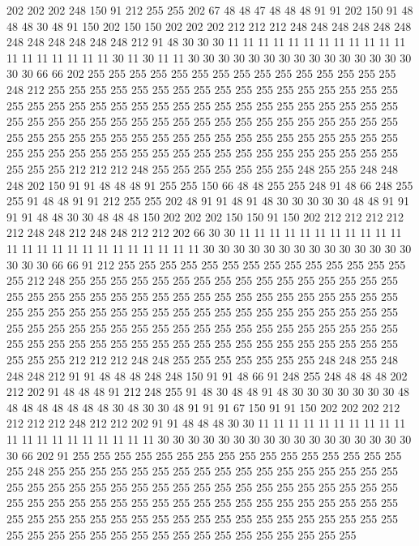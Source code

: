 202 202 202 248 150 91 212 255 255 202 67 48 48 47 48 48 48 91 91 202
150 91 48 48 48 30 48 91 150 202 150 150 202 202 202 212 212 212 248 248
248 248 248 248 248 248 248 248 248 248 212 91 48 30 30 30 11 11 11 11
11 11 11 11 11 11 11 11 11 11 11 11 11 11 11 30 11 30 11 11
30 30 30 30 30 30 30 30 30 30 30 30 30 30 30 30 30 66 66 202
255 255 255 255 255 255 255 255 255 255 255 255 255 255 255 248 212 255 255 255
255 255 255 255 255 255 255 255 255 255 255 255 255 255 255 255 255 255 255 255
255 255 255 255 255 255 255 255 255 255 255 255 255 255 255 255 255 255 255 255
255 255 255 255 255 255 255 255 255 255 255 255 255 255 255 255 255 255 255 255
255 255 255 255 255 255 255 255 255 255 255 255 255 255 255 255 255 255 255 255
255 255 255 255 255 255 255 255 255 255 255 255 255 212 212 212 248 255 255 255
255 255 255 255 248 255 255 248 248 248 202 150 91 91 48 48 48 91 255 255
150 66 48 48 255 255 248 91 48 66 248 255 255 91 48 48 91 91 212 255
255 202 48 91 91 48 91 48 30 30 30 30 30 48 48 91 91 91 91 48
48 30 30 48 48 48 150 202 202 202 150 150 91 150 202 212 212 212 212 212
248 248 212 248 248 212 212 202 66 30 30 11 11 11 11 11 11 11 11 11
11 11 11 11 11 11 11 11 11 11 11 11 11 11 11 30 30 30 30 30
30 30 30 30 30 30 30 30 30 30 30 30 66 66 91 212 255 255 255 255
255 255 255 255 255 255 255 255 255 255 255 212 248 255 255 255 255 255 255 255
255 255 255 255 255 255 255 255 255 255 255 255 255 255 255 255 255 255 255 255
255 255 255 255 255 255 255 255 255 255 255 255 255 255 255 255 255 255 255 255
255 255 255 255 255 255 255 255 255 255 255 255 255 255 255 255 255 255 255 255
255 255 255 255 255 255 255 255 255 255 255 255 255 255 255 255 255 255 255 255
255 255 255 255 255 255 255 255 212 212 212 248 248 255 255 255 255 255 255 255
248 248 255 248 248 248 212 91 91 48 48 48 248 248 150 91 91 48 66 91
248 255 248 48 48 48 202 212 202 91 48 48 48 91 212 248 255 91 48 30
48 48 91 48 30 30 30 30 30 30 30 48 48 48 48 48 48 48 48 30
48 30 30 48 91 91 91 67 150 91 91 150 202 202 202 212 212 212 212 248
212 212 202 91 91 48 48 48 30 30 11 11 11 11 11 11 11 11 11 11
11 11 11 11 11 11 11 11 11 11 30 30 30 30 30 30 30 30 30 30
30 30 30 30 30 30 30 30 66 202 91 255 255 255 255 255 255 255 255 255
255 255 255 255 255 255 255 255 248 255 255 255 255 255 255 255 255 255 255 255
255 255 255 255 255 255 255 255 255 255 255 255 255 255 255 255 255 255 255 255
255 255 255 255 255 255 255 255 255 255 255 255 255 255 255 255 255 255 255 255
255 255 255 255 255 255 255 255 255 255 255 255 255 255 255 255 255 255 255 255
255 255 255 255 255 255 255 255 255 255 255 255 255 255 255 255 255 255 255 255
